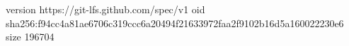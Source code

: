 version https://git-lfs.github.com/spec/v1
oid sha256:f94cc4a81ae6706c319ccc6a20494f21633972faa2f9102b16d5a160022230e6
size 196704
